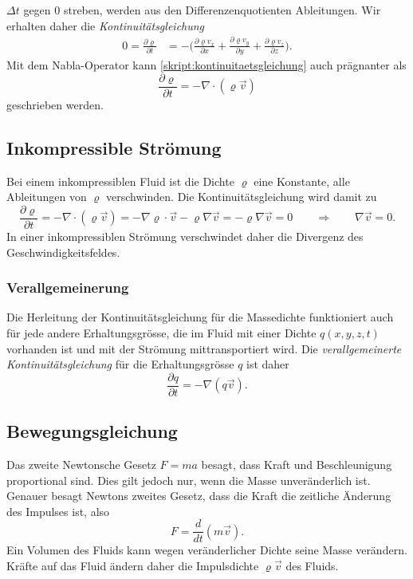 $\Delta t$ gegen $0$ streben, werden aus den Differenzenquotienten
Ableitungen.
Wir erhalten daher die {\em Kontinuitätsgleichung}
\begin{align}
0
=
\frac{\partial \varrho}{\partial t}
&=
-
\biggl(
\frac{\partial \varrho v_x}{\partial x}
+
\frac{\partial \varrho v_y}{\partial y}
+
\frac{\partial \varrho v_z}{\partial z}
\biggr).
\label{skript:kontinuitaetsgleichung}
\end{align}
%
Mit dem Nabla-Operator kann
\eqref{skript:kontinuitaetsgleichung}
auch prägnanter als
\begin{equation}
\frac{\partial \varrho}{\partial t}
=
-\nabla\cdot (\varrho\vec{v})
\label{skript:hydro:kontvekt}
\end{equation}
geschrieben werden.

\subsection{Inkompressible Strömung}
Bei einem inkompressiblen Fluid ist die Dichte $\varrho$ eine Konstante, alle
Ableitungen von $\varrho$ verschwinden.
Die Kontinuitätsgleichung wird damit zu
\[
\frac{\partial\varrho}{\partial t}
=
-\nabla\cdot(\varrho\vec{v})
=
-\nabla\varrho\cdot\vec{v}
-\varrho\nabla\vec{v}
=
-\varrho\nabla\vec{v}
=
0
\qquad\Rightarrow\qquad
\nabla\vec{v}=0.
\]
In einer inkompressiblen Strömung verschwindet daher die Divergenz
des Geschwindigkeitsfeldes.

\subsubsection{Verallgemeinerung}
Die Herleitung der Kontinuitätsgleichung für die Massedichte funktioniert
auch für jede andere Erhaltungsgrösse, die im Fluid mit einer Dichte
$q(x,y,z,t)$ vorhanden ist und mit der Strömung mittransportiert wird.
Die {\em verallgemeinerte Kontinuitätsgleichung} für die Erhaltungsgrösse $q$
ist daher
\begin{equation}
\frac{\partial q}{\partial t}
=
-
\nabla(q\vec{v}).
\label{skript:verallgemeinerte kontinuitaetsgleichung}
\end{equation}

\subsection{Bewegungsgleichung}
Das zweite Newtonsche Gesetz $F=ma$ besagt, dass Kraft und Beschleunigung
proportional sind.
Dies gilt jedoch nur, wenn die Masse unveränderlich ist.
Genauer besagt Newtons zweites Gesetz, dass die Kraft die
zeitliche Änderung des Impulses ist, also
\[
F=
\frac{d}{dt}(m\vec v).
\]
Ein Volumen des Fluids kann wegen veränderlicher Dichte seine
Masse verändern.
Kräfte auf das Fluid ändern daher die Impulsdichte
$\varrho\vec{v}$
des Fluids.

